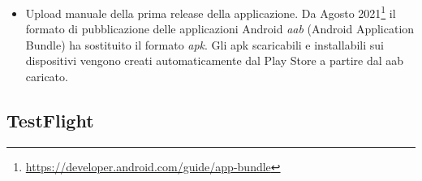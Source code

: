 \begin{itemize}
\begin{itemize}
        \begin{listing}[H]
        \inputminted{bash}{code/4-jks}
        \caption{Creazione, codifica e decodifica della chiave JKS}
        \end{listing}
    \end{itemize}
    \item Upload manuale della prima release della applicazione. Da Agosto 2021\footnote{\url{https://developer.android.com/guide/app-bundle}} il formato di pubblicazione delle applicazioni Android \textit{aab} (Android Application Bundle) ha sostituito il formato \textit{apk}. Gli apk scaricabili e installabili sui dispositivi vengono creati automaticamente dal Play Store a partire dal aab caricato.
\end{itemize}

\subsection{TestFlight}
